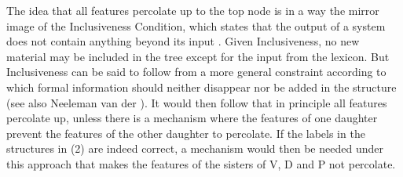 \documentclass[output=paper
,modfonts
,nonflat]{langsci/langscibook}
\begin{document}
\begin{figure} 
	\begin{exe}	
	\end{exe}
\end{figure}
\noindent The idea that all features percolate up to the top node is in a way the mirror image of the Inclusiveness Condition, which states that the output of a system does not contain anything beyond its input \citep[225]{Chomsky1995}. Given Inclusiveness, no new material may be included in the tree except for the input from the lexicon. But Inclusiveness can be said to follow from a more general constraint according to which formal information should neither disappear nor be added in the structure (see also Neeleman van der \citealt{Koot2002}). It would then follow that in principle all features percolate up, unless there is a mechanism where the features of one daughter prevent the features of the other daughter to percolate. If the labels in the structures in (2) are indeed correct, a mechanism would then be needed under this approach that makes the features of the sisters of V, D and P not percolate. 
\end{document}
